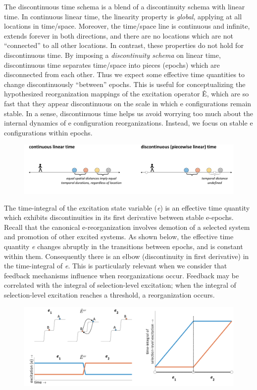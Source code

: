 The discontinuous time schema is a blend of a discontinuity schema with linear time. In continuous linear time, the linearity property is \textit{global}, applying at all locations in time/space. Moreover, the time/space line is continuous and infinite, extends forever in both directions, and there are no locations which are not “connected” to all other locations. In contrast, these properties do not hold for discontinuous time. By imposing a \textit{discontinuity schema} on linear time, discontinuous time separates time/space into pieces (epochs) which are disconnected from each other. Thus we expect some effective time quantities to change discontinuously “between” epochs. This is useful for conceptualizing the hypothesized reorganization mappings of the excitation operator Ê, which are so fast that they appear discontinuous on the scale in which e configurations remain stable. In a sense, discontinuous time helps us avoid worrying too much about the internal dynamics of e configuration reorganizations. Instead, we focus on stable e configurations within epochs.

  
\begin{figure}
\includegraphics[width=\textwidth]{figures/Tilsen-img49.png}
\caption{\missingcaption}
\label{fig:}
\end{figure}
 

  The time-integral of the excitation state variable (\textit{e}) is an effective time quantity which exhibits discontinuities in its first derivative between stable e-epochs. Recall that the canonical e-reorganization involves demotion of a selected system and promotion of other excited systems. As shown below, the effective time quantity \textit{e} changes abruptly in the transitions between epochs, and is constant within them. Consequently there is an elbow (discontinuity in first derivative) in the time-integral of \textit{e}. This is particularly relevant when we consider that feedback mechanisms influence when reorganizations occur. Feedback may be correlated with the integral of selection-level excitation; when the integral of selection-level excitation reaches a threshold, a reorganization occurs.

  
\begin{figure}
\includegraphics[width=\textwidth]{figures/Tilsen-img50.png}
\caption{\missingcaption}
\label{fig:}
\end{figure}
 

